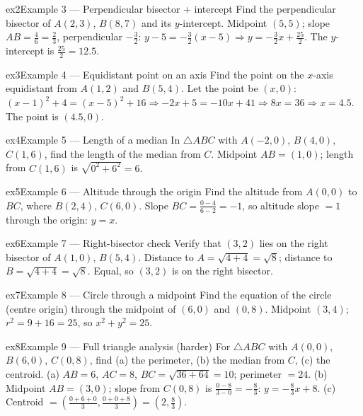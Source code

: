 \documentclass[11pt]{article}
\begin{document}
\begin{example}{ex2}{Example 3 --- Perpendicular bisector + intercept}
Find the perpendicular bisector of $A(2,3)$, $B(8,7)$ and its $y$-intercept.
\soln Midpoint $(5,5)$; slope $AB=\tfrac{4}{6}=\tfrac23$, perpendicular $-\tfrac32$: $y-5=-\tfrac32(x-5)\Rightarrow y=-\tfrac32x+\tfrac{25}{2}$. The $y$-intercept is $\tfrac{25}{2}=12.5.$
\end{example}

\begin{example}{ex3}{Example 4 --- Equidistant point on an axis}
Find the point on the $x$-axis equidistant from $A(1,2)$ and $B(5,4)$.
\soln Let the point be $(x,0)$: $(x-1)^2+4=(x-5)^2+16\Rightarrow -2x+5=-10x+41\Rightarrow 8x=36\Rightarrow x=4.5$. The point is $(4.5,0).$
\end{example}

\begin{example}{ex4}{Example 5 --- Length of a median}
In $\triangle ABC$ with $A(-2,0)$, $B(4,0)$, $C(1,6)$, find the length of the median from $C$.
\soln Midpoint $AB=(1,0)$; length from $C(1,6)$ is $\sqrt{0^2+6^2}=6.$
\end{example}

\begin{example}{ex5}{Example 6 --- Altitude through the origin}
Find the altitude from $A(0,0)$ to $BC$, where $B(2,4)$, $C(6,0)$.
\soln Slope $BC=\tfrac{0-4}{6-2}=-1$, so altitude slope $=1$ through the origin: $y=x.$
\end{example}

\begin{example}{ex6}{Example 7 --- Right-bisector check}
Verify that $(3,2)$ lies on the right bisector of $A(1,0)$, $B(5,4)$.
\soln Distance to $A=\sqrt{4+4}=\sqrt8$; distance to $B=\sqrt{4+4}=\sqrt8$. Equal, so $(3,2)$ is on the right bisector.
\end{example}

\begin{example}{ex7}{Example 8 --- Circle through a midpoint}
Find the equation of the circle (centre origin) through the midpoint of $(6,0)$ and $(0,8)$.
\soln Midpoint $(3,4)$; $r^2=9+16=25$, so $x^2+y^2=25.$
\end{example}

\begin{example}{ex8}{Example 9 --- Full triangle analysis (harder)}
For $\triangle ABC$ with $A(0,0)$, $B(6,0)$, $C(0,8)$, find (a) the perimeter, (b) the median from $C$, (c) the centroid.
\soln (a) $AB=6$, $AC=8$, $BC=\sqrt{36+64}=10$; perimeter $=24$. (b) Midpoint $AB=(3,0)$; slope from $C(0,8)$ is $\tfrac{0-8}{3-0}=-\tfrac83$: $y=-\tfrac83x+8$. (c) Centroid $=\left(\tfrac{0+6+0}{3},\tfrac{0+0+8}{3}\right)=\left(2,\tfrac83\right).$
\end{example}
\end{document}
